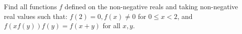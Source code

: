 Find all functions $f$ defined on the non-negative reals and taking non-negative real values such that: $f(2)=0,f(x)\ne0$ for $0\le x<2$,  and $f(xf(y))f(y)=f(x+y)$ for all $x,y$.